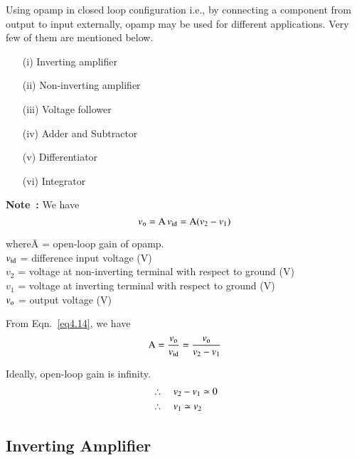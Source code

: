 Using opamp in closed loop configuration i.e., by connecting a component from output to input externally, opamp may be used for different applications. Very few of them are mentioned below.
\begin{itemize}
\item[(i)] Inverting amplifier

\item[(ii)] Non-inverting amplifier

\item[(iii)] Voltage follower

\item[(iv)] Adder and Subtractor

\item[(v)] Differentiator

\item[(vi)] Integrator
\end{itemize}

\noindent
{\bf Note~:} We have
\begin{equation}
v_{\textrm{o}}=\textrm{A} \, v_{\operatorname{id}}=\textrm{A}(v_{2}-v_{1})\label{eq4.14}
\end{equation}
\begin{tabbing}
where\quad \= A = open-loop gain of opamp.\\[3pt] 
           \> $v_{\operatorname{id}}$ = difference input voltage (V)\\[3pt]
           \> $v_{2}$ = voltage at non-inverting terminal with respect to ground (V)\\[3pt]
           \> $v_{1}$ = voltage at inverting terminal with respect to ground (V)\\[3pt]
           \> $v_{\textrm{o}}$ = output voltage (V) 
\end{tabbing}

From Eqn.~\eqref{eq4.14}, we have
\begin{equation}
\textrm{A} =\frac{v_{\textrm{o}}}{v_{\operatorname{id}}}=\frac{v_{\textrm{o}}}{v_{2}-v_{1}}\label{eq4.15}
\end{equation}

Ideally, open-loop gain is infinity.
\begin{align}
&\therefore\quad v_{2}-v_{1}\simeq 0\notag\\
&\therefore\quad v_{1}\simeq v_{2}\label{eq4.16}
\end{align}

\subsection{Inverting Amplifier}\label{sec4.6.1}

